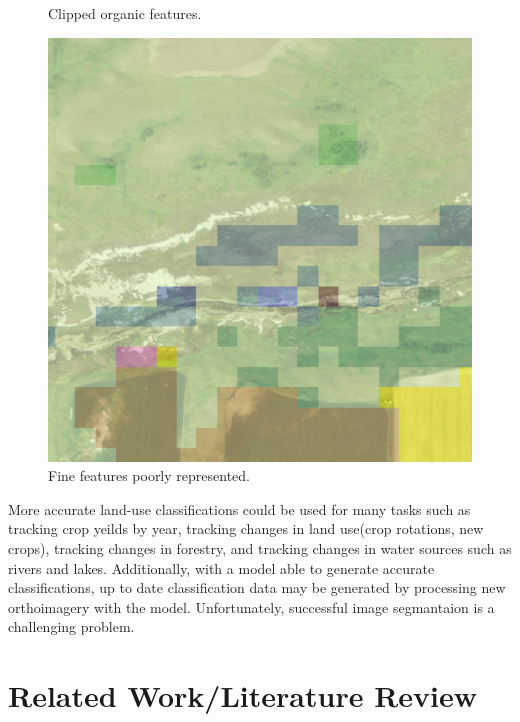 \documentclass[12pt]{article}
\begin{document}
\begin{center}
\begin{figure}[!htb]
      \caption{Clipped organic features.}
    \endminipage\hfill
      \includegraphics[width=\linewidth]{images/poor_labels_3.png}
      \caption{Fine features poorly represented.}   
    \endminipage 
  \end{figure}
\end{center}

\newpage

More accurate land-use classifications could be used for many tasks such as tracking crop yeilds by year, tracking changes in land use(crop rotations, new crops), tracking changes in forestry, and tracking changes in water sources such as rivers and lakes. Additionally, with a model able to generate accurate classifications, up to date classification data may be generated by processing new orthoimagery with the model. Unfortunately, successful image segmantaion is a challenging problem.

\section{Related Work/Literature Review}
\end{document}
